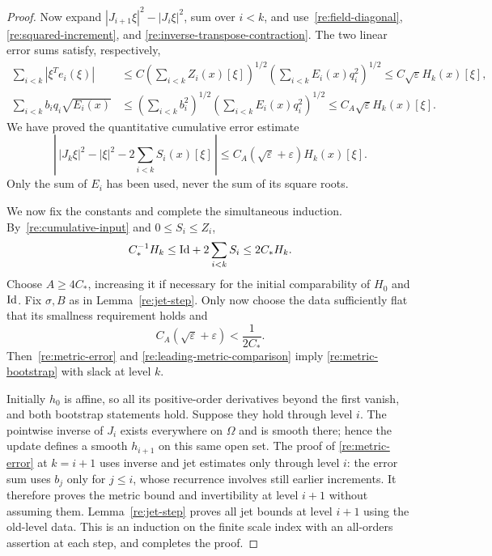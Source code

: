 \begin{proof}
Now expand $|J_{i+1}\xi|^2-|J_i\xi|^2$, sum over $i<k$,
and use~\eqref{re:field-diagonal},
\eqref{re:squared-increment}, and
\eqref{re:inverse-transpose-contraction}.  The two linear error
sums satisfy, respectively,
\begin{align*}
 \sum_{i<k}|\xi^Te_i(\xi)|
 &\le C\left(\sum_{i<k}Z_i(x)[\xi]\right)^{1/2}
          \left(\sum_{i<k}E_i(x)q_i^2\right)^{1/2}
 \le C\sqrt\varepsilon H_k(x)[\xi],\\
 \sum_{i<k}b_iq_i\sqrt{E_i(x)}
 &\le\left(\sum_{i<k}b_i^2\right)^{1/2}
          \left(\sum_{i<k}E_i(x)q_i^2\right)^{1/2}
 \le C_A\sqrt\varepsilon H_k(x)[\xi].
\end{align*}
We have proved the quantitative cumulative error estimate
\begin{equation}
 \label{re:metric-error}
 \left|\,|J_k\xi|^2-|\xi|^2
                       -2\sum_{i<k}S_i(x)[\xi]\,\right|
       \le C_A(\sqrt\varepsilon+\varepsilon)H_k(x)[\xi].
\end{equation}
Only the sum of $E_i$ has been used, never the sum of its square
roots.

We now fix the constants and complete the simultaneous induction.
By~\eqref{re:cumulative-input} and $0\le S_i\le Z_i$,
\begin{equation}
 \label{re:leading-metric-comparison}
 C_*^{-1}H_k
       \le\mathrm{Id}+2\sum_{i<k}S_i
       \le2C_*H_k.
\end{equation}
Choose $A\ge4C_*$, increasing it if necessary for the initial
comparability of $H_0$ and $\mathrm{Id}$.  Fix $\sigma,B$ as in
Lemma~\ref{re:jet-step}.  Only now choose the data sufficiently flat
that its smallness requirement holds and
\[
 C_A(\sqrt\varepsilon+\varepsilon)<\frac1{2C_*}.
\]
Then~\eqref{re:metric-error} and
\eqref{re:leading-metric-comparison} imply
\eqref{re:metric-bootstrap} with slack at level $k$.

Initially $h_0$ is affine, so all its positive-order derivatives
beyond the first vanish, and both bootstrap statements hold.
Suppose they hold through level $i$.  The pointwise inverse of $J_i$
exists everywhere on $\Omega$ and is smooth there; hence the update
defines a smooth $h_{i+1}$ on this same open set.  The proof of
\eqref{re:metric-error} at $k=i+1$ uses inverse and jet estimates
only through level $i$: the error sum uses $b_j$ only for $j\le i$,
whose recurrence involves still earlier increments.  It therefore
proves the metric bound and invertibility at level $i+1$ without
assuming them.  Lemma~\ref{re:jet-step} proves all jet bounds at
level $i+1$ using the old-level data.  This is an induction on the
finite scale index with an all-orders assertion at each step, and
completes the proof.
\end{proof}

